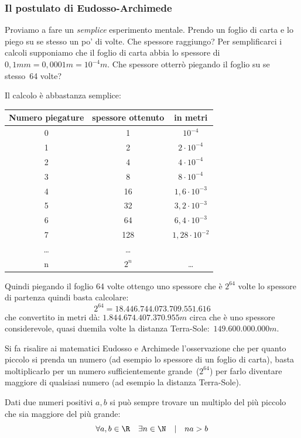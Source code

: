\subsubsection{Il postulato di Eudosso-Archimede}

Proviamo a fare un \emph{semplice} esperimento mentale. Prendo un foglio di 
carta e lo piego su se stesso un po' di volte. Che spessore raggiungo?
Per semplificarci i calcoli supponiamo che il foglio di carta abbia lo 
spessore di $0,1mm = 0,0001m = 10^{-4}m$. 
Che spessore otterrò piegando il foglio su se stesso~64 volte?

Il calcolo è abbastanza semplice:

\begin{center}
 \begin{tabular}{ccc}
\toprule
Numero piegature & spessore ottenuto & in metri\\
\midrule
0 & 1 & $10^{-4}$\\
1 & 2 & $2 \cdot 10^{-4}$\\
2 & 4 & $4 \cdot 10^{-4}$\\
3 & 8 & $8 \cdot 10^{-4}$\\
4 & 16 & $1,6 \cdot 10^{-3}$\\
5 & 32 & $3,2 \cdot 10^{-3}$\\
6 & 64 & $6,4 \cdot 10^{-3}$\\
7 & 128 & $1,28 \cdot 10^{-2}$\\
\ldots& \ldots\\
n & $2^n$ & \ldots\\
\bottomrule
\end{tabular}
\end{center}

Quindi piegando il foglio 64 volte ottengo uno spessore che è $2^{64}$ 
volte lo spessore di partenza quindi basta calcolare:
\[2^{64} = 18.446.744.073.709.551.616\]
che convertito in metri dà: $1.844.674.407.370.955m$ circa che è uno 
spessore considerevole, quasi duemila volte la distanza 
Terra-Sole:~$149.600.000.000m$.

Si fa risalire ai matematici Eudosso e Archimede l'osservazione che per 
quanto piccolo si prenda un numero (ad esempio lo spessore di un foglio di 
carta), basta moltiplicarlo per un numero sufficientemente 
grande~($2^{64}$) 
per farlo diventare maggiore di qualsiasi numero (ad esempio la distanza 
Terra-Sole).

\begin{postulato}
Dati due numeri positivi \(a, b\) si può sempre trovare un 
multiplo del più piccolo che sia maggiore del più grande:
\[\forall a, b \in \R \quad \exists n \in \N \quad | \quad na>b\]
\end{postulato}

